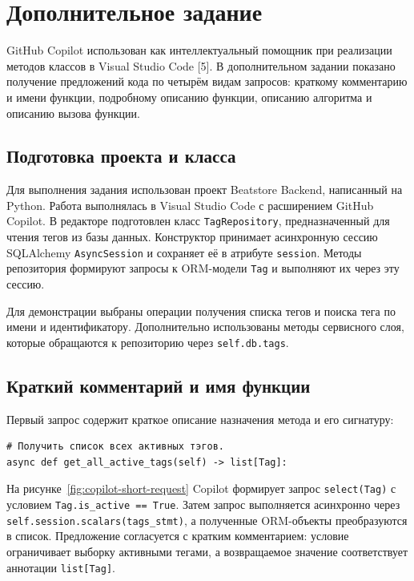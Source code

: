 \section{Дополнительное задание}

GitHub Copilot использован как интеллектуальный помощник при реализации
методов классов в Visual Studio Code [5]. В дополнительном задании показано
получение предложений кода по четырём видам запросов: краткому комментарию
и имени функции, подробному описанию функции, описанию алгоритма и описанию
вызова функции.

\subsection{Подготовка проекта и класса}

Для выполнения задания использован проект Beatstore Backend, написанный
на Python. Работа выполнялась в Visual Studio Code с расширением
GitHub Copilot. В редакторе подготовлен класс \verb|TagRepository|,
предназначенный для чтения тегов из базы данных. Конструктор принимает
асинхронную сессию SQLAlchemy \verb|AsyncSession| и сохраняет её в атрибуте
\verb|session|. Методы репозитория формируют запросы к ORM-модели
\verb|Tag| и выполняют их через эту сессию.

Для демонстрации выбраны операции получения списка тегов и поиска тега
по имени и идентификатору. Дополнительно использованы методы сервисного
слоя, которые обращаются к репозиторию через \verb|self.db.tags|.

\subsection{Краткий комментарий и имя функции}

Первый запрос содержит краткое описание назначения метода и его сигнатуру:

\begingroup
\small
\renewcommand{\ttdefault}{\rmdefault}
\begin{verbatim}
# Получить список всех активных тэгов.
async def get_all_active_tags(self) -> list[Tag]:
\end{verbatim}
\endgroup

На рисунке~\ref{fig:copilot-short-request} Copilot формирует
запрос \verb|select(Tag)| с условием \verb|Tag.is_active == True|.
Затем запрос выполняется асинхронно через
\verb|self.session.scalars(tags_stmt)|, а полученные ORM-объекты
преобразуются в список. Предложение согласуется с кратким комментарием:
условие ограничивает выборку активными тегами, а возвращаемое значение
соответствует аннотации \verb|list[Tag]|.

